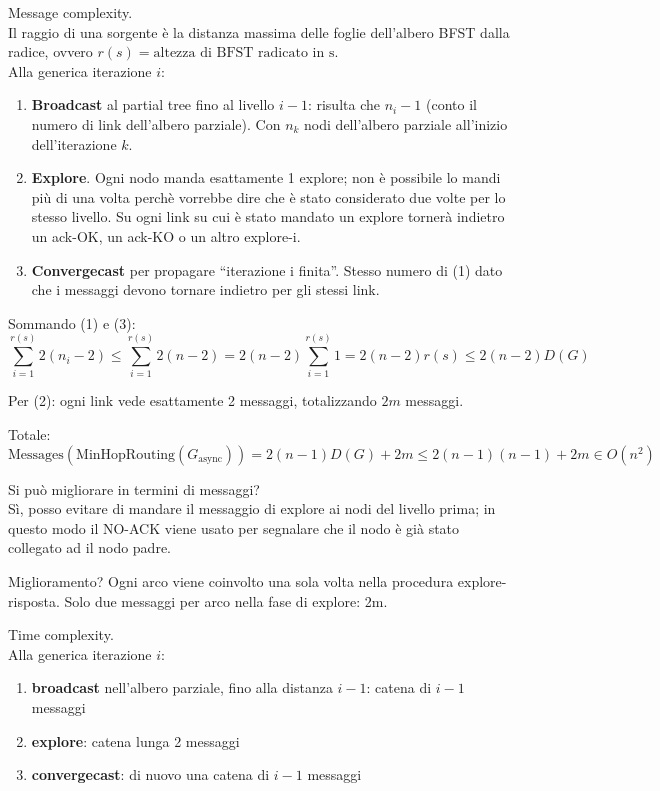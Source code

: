 Message complexity.\\
Il raggio di una sorgente è la distanza massima delle foglie dell'albero BFST dalla radice, ovvero $r(s) = \text{altezza di BFST radicato in s}$.\\
Alla generica iterazione $i$:
\begin{enumerate}
 \item \textbf{Broadcast} al partial tree fino al livello $i-1$:
 risulta che $n_i - 1$ (conto il numero di link dell'albero parziale). Con $n_k$ nodi dell'albero parziale all'inizio dell'iterazione $k$.
 \item \textbf{Explore}. Ogni nodo manda esattamente 1 explore; non è possibile lo mandi più di una volta perchè vorrebbe dire che è stato considerato due volte per
 lo stesso livello. Su ogni link su cui è stato mandato un explore tornerà indietro un ack-OK, un ack-KO o un altro explore-i.
 \item \textbf{Convergecast} per propagare ``iterazione i finita''. Stesso numero di (1) dato che i messaggi devono tornare indietro per gli stessi link.
\end{enumerate}

Sommando (1) e (3):
$$
\sum_{i=1}^{r(s)} 2 (n_i - 2) \leq \sum_{i=1}^{r(s)} 2 (n - 2) = 2 (n - 2) \sum_{i=1}^{r(s)} 1 = 2 (n - 2) r(s) \leq 2 (n-2) D(G)
$$

Per (2): ogni link vede esattamente 2 messaggi, totalizzando $2m$ messaggi.

Totale:
$$
\text{Messages}(\text{MinHopRouting}(G_\text{async})) = 2(n-1)D(G) + 2m \leq 2(n-1)(n-1)+2m \in O(n^2)
$$

Si può migliorare in termini di messaggi?\\
Sì, posso evitare di mandare il messaggio di explore ai nodi del livello prima;
in questo modo il NO-ACK viene usato per segnalare che il nodo è già stato collegato ad il nodo padre.

Miglioramento? Ogni arco viene coinvolto una sola volta nella procedura explore-risposta.
Solo due messaggi per arco nella fase di explore: 2m.

Time complexity.\\
Alla generica iterazione $i$:
\begin{enumerate}
  \item \textbf{broadcast} nell'albero parziale, fino alla distanza $i-1$: catena di $i-1$ messaggi
  \item \textbf{explore}: catena lunga 2 messaggi
  \item \textbf{convergecast}: di nuovo una catena di $i-1$ messaggi
\end{enumerate}

